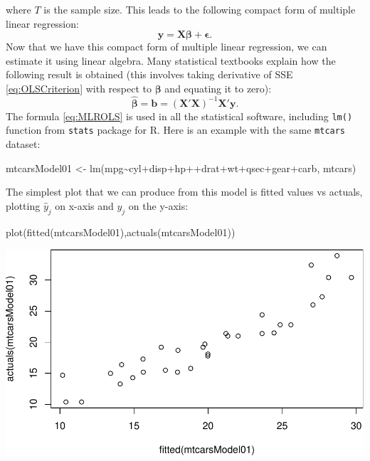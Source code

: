 \documentclass[
]{book}
\newenvironment{Shaded}{\begin{snugshade}}{\end{snugshade}}
\newcommand{\FunctionTok}[1]{\textcolor[rgb]{0.00,0.00,0.00}{#1}}
\newcommand{\NormalTok}[1]{#1}
\newcommand{\OtherTok}[1]{\textcolor[rgb]{0.56,0.35,0.01}{#1}}
\newcommand{\SpecialCharTok}[1]{\textcolor[rgb]{0.00,0.00,0.00}{#1}}
\theoremstyle{definition}
\theoremstyle{definition}
\theoremstyle{definition}
\theoremstyle{definition}
\theoremstyle{remark}
\begin{document}
where \(T\) is the sample size. This leads to the following compact form of multiple linear regression:
\begin{equation}
    \mathbf{y} = \mathbf{X} \boldsymbol{\beta} + \boldsymbol{\epsilon} .
    \label{eq:MLRFormulaCompactest}
\end{equation}
Now that we have this compact form of multiple linear regression, we can estimate it using linear algebra. Many statistical textbooks explain how the following result is obtained (this involves taking derivative of SSE \eqref{eq:OLSCriterion} with respect to \(\boldsymbol{\beta}\) and equating it to zero):
\begin{equation}
    \hat{\boldsymbol{\beta}} = \mathbf{b} = \left(\mathbf{X}' \mathbf{X}\right)^{-1} \mathbf{X}' \mathbf{y} .
    \label{eq:MLROLS}
\end{equation}
The formula \eqref{eq:MLROLS} is used in all the statistical software, including \texttt{lm()} function from \texttt{stats} package for R. Here is an example with the same \texttt{mtcars} dataset:

\begin{Shaded}
\begin{Highlighting}[]
\NormalTok{mtcarsModel01 }\OtherTok{\textless{}{-}} \FunctionTok{lm}\NormalTok{(mpg}\SpecialCharTok{\textasciitilde{}}\NormalTok{cyl}\SpecialCharTok{+}\NormalTok{disp}\SpecialCharTok{+}\NormalTok{hp}\SpecialCharTok{++}\NormalTok{drat}\SpecialCharTok{+}\NormalTok{wt}\SpecialCharTok{+}\NormalTok{qsec}\SpecialCharTok{+}\NormalTok{gear}\SpecialCharTok{+}\NormalTok{carb, mtcars)}
\end{Highlighting}
\end{Shaded}

The simplest plot that we can produce from this model is fitted values vs actuals, plotting \(\hat{y}_j\) on x-axis and \(y_j\) on the y-axis:

\begin{Shaded}
\begin{Highlighting}[]
\FunctionTok{plot}\NormalTok{(}\FunctionTok{fitted}\NormalTok{(mtcarsModel01),}\FunctionTok{actuals}\NormalTok{(mtcarsModel01))}
\end{Highlighting}
\end{Shaded}

\includegraphics{Svetunkov---Statistics-for-Business-Analytics_files/figure-latex/unnamed-chunk-62-1.pdf}
\end{document}
